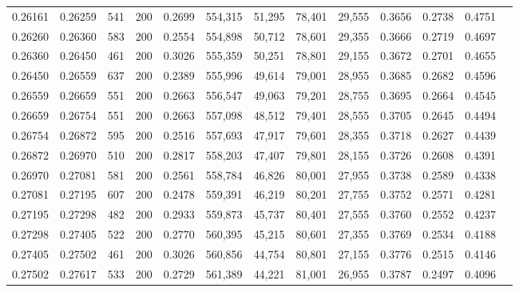 \begin{tabular}{rrrrrrrrrrrrr}
0.26161 & 0.26259 &   541 & 200 &                                     0.2699 & 554,315 &  51,295 &  78,401 &  29,555 & 0.3656 & 0.2738 & 0.4751 \\
0.26260 & 0.26360 &   583 & 200 &                                     0.2554 & 554,898 &  50,712 &  78,601 &  29,355 & 0.3666 & 0.2719 & 0.4697 \\
0.26360 & 0.26450 &   461 & 200 &                                     0.3026 & 555,359 &  50,251 &  78,801 &  29,155 & 0.3672 & 0.2701 & 0.4655 \\
0.26450 & 0.26559 &   637 & 200 &                                     0.2389 & 555,996 &  49,614 &  79,001 &  28,955 & 0.3685 & 0.2682 & 0.4596 \\
0.26559 & 0.26659 &   551 & 200 &                                     0.2663 & 556,547 &  49,063 &  79,201 &  28,755 & 0.3695 & 0.2664 & 0.4545 \\
0.26659 & 0.26754 &   551 & 200 &                                     0.2663 & 557,098 &  48,512 &  79,401 &  28,555 & 0.3705 & 0.2645 & 0.4494 \\
0.26754 & 0.26872 &   595 & 200 &                                     0.2516 & 557,693 &  47,917 &  79,601 &  28,355 & 0.3718 & 0.2627 & 0.4439 \\
0.26872 & 0.26970 &   510 & 200 &                                     0.2817 & 558,203 &  47,407 &  79,801 &  28,155 & 0.3726 & 0.2608 & 0.4391 \\
0.26970 & 0.27081 &   581 & 200 &                                     0.2561 & 558,784 &  46,826 &  80,001 &  27,955 & 0.3738 & 0.2589 & 0.4338 \\
0.27081 & 0.27195 &   607 & 200 &                                     0.2478 & 559,391 &  46,219 &  80,201 &  27,755 & 0.3752 & 0.2571 & 0.4281 \\
0.27195 & 0.27298 &   482 & 200 &                                     0.2933 & 559,873 &  45,737 &  80,401 &  27,555 & 0.3760 & 0.2552 & 0.4237 \\
0.27298 & 0.27405 &   522 & 200 &                                     0.2770 & 560,395 &  45,215 &  80,601 &  27,355 & 0.3769 & 0.2534 & 0.4188 \\
0.27405 & 0.27502 &   461 & 200 &                                     0.3026 & 560,856 &  44,754 &  80,801 &  27,155 & 0.3776 & 0.2515 & 0.4146 \\
0.27502 & 0.27617 &   533 & 200 &                                     0.2729 & 561,389 &  44,221 &  81,001 &  26,955 & 0.3787 & 0.2497 & 0.4096 \\

\end{tabular}
